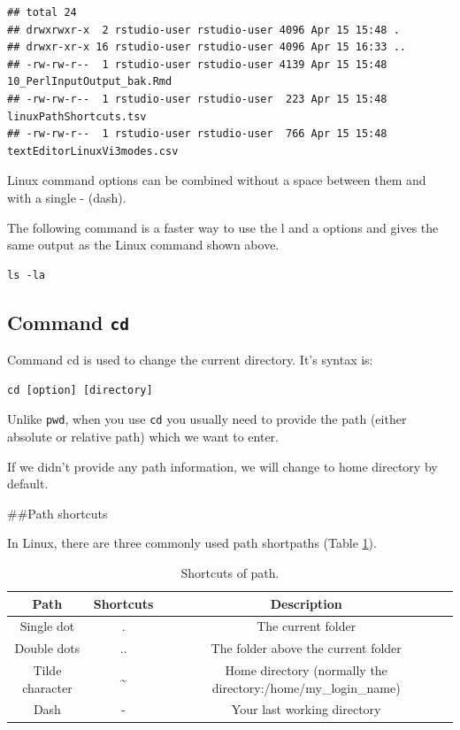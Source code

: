 \documentclass[]{book}
\begin{document}
\begin{verbatim}
## total 24
## drwxrwxr-x  2 rstudio-user rstudio-user 4096 Apr 15 15:48 .
## drwxr-xr-x 16 rstudio-user rstudio-user 4096 Apr 15 16:33 ..
## -rw-rw-r--  1 rstudio-user rstudio-user 4139 Apr 15 15:48 10_PerlInputOutput_bak.Rmd
## -rw-rw-r--  1 rstudio-user rstudio-user  223 Apr 15 15:48 linuxPathShortcuts.tsv
## -rw-rw-r--  1 rstudio-user rstudio-user  766 Apr 15 15:48 textEditorLinuxVi3modes.csv
\end{verbatim}

Linux command options can be combined without a space between them and with a single - (dash).

The following command is a faster way to use the l and a options and gives the same output as the Linux command shown above.

\begin{verbatim}
ls -la 
\end{verbatim}

\hypertarget{command-cd}{%
\subsection{\texorpdfstring{Command \texttt{cd}}{Command cd}}\label{command-cd}}

Command cd is used to change the current directory. It's syntax is:

\begin{verbatim}
cd [option] [directory]
\end{verbatim}

Unlike \texttt{pwd}, when you use \texttt{cd} you usually need to provide the path (either absolute or relative path) which we want to enter.

If we didn't provide any path information, we will change to home directory by default.

\#\#Path shortcuts

In Linux, there are three commonly used path shortpaths (Table \ref{tab:linuxPathShortcuts}).



\begin{table}[t]

\caption{\label{tab:linuxPathShortcuts}Shortcuts of path.}
\centering
\begin{tabular}{c|c|c}
\hline
Path & Shortcuts & Description\\
\hline
Single dot & . & The current folder\\
\hline
Double dots & .. & The folder above the current folder\\
\hline
Tilde character & \textasciitilde{} & Home directory (normally the directory:/home/my\_login\_name)\\
\hline
Dash & - & Your last working directory\\
\hline
\end{tabular}
\end{table}
\end{document}
